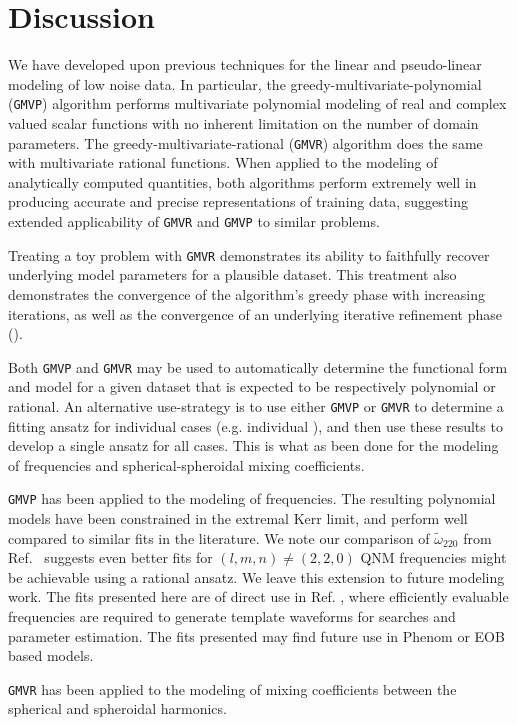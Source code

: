 \documentclass[twocolumn,aps,prd,floatfix,preprintnumbers,a4paper,nofootinbib,
superscriptaddress,10pt]{revtex4-1}
\newcommand{\cw}{\tilde{\omega}}
\def\gmvp#1{greedy-multivariate-polynomial#1
  (\texttt{GMVP}#1)\gdef\gmvp{\texttt{GMVP}}}
\def\gmvr#1{greedy-multivariate-rational#1
  (\texttt{GMVR}#1)\gdef\gmvr{\texttt{GMVR}}}
\begin{document}
\section{Discussion}
\label{discuss}
%
\par We have developed upon previous techniques for the linear and pseudo-linear modeling of low noise data.
%
In particular, the \gmvp{} algorithm performs multivariate polynomial modeling of real and complex valued scalar functions with no inherent limitation on the number of domain parameters.
%
The \gmvr{} algorithm does the same with multivariate rational functions.
%
When applied to the modeling of analytically computed quantities, both algorithms perform extremely well in producing accurate and precise representations of training data, suggesting extended applicability of \gmvr{} and \gmvp{} to similar problems.
%
\par Treating a toy problem with \gmvr{} demonstrates its ability to faithfully recover underlying model parameters for a plausible dataset.
%
This treatment also demonstrates the convergence of the algorithm's greedy phase with increasing iterations, as well as the convergence of an underlying iterative refinement phase ().
%
%
%
\par Both \gmvp{} and \gmvr{} may be used to automatically determine the functional form and model for a given dataset that is expected to be respectively polynomial or rational.
%
An alternative use-strategy is to use either \gmvp{} or \gmvr{} to determine a fitting ansatz for individual cases (e.g. individual ), and then use these results to develop a single ansatz for all cases.
%
This is what as been done for the modeling of \qnm{} frequencies and spherical-spheroidal mixing coefficients.
%
%
\par \gmvp{} has been applied to the modeling of \qnm{} frequencies. The resulting polynomial models have been constrained in the extremal Kerr limit, and perform well compared to similar fits in the literature. We note our comparison of $\cw_{220}$ from Ref.~\cite{Nagar:2018zoe} suggests even better fits for $(l,m,n)\neq(2,2,0)$ QNM frequencies might be achievable using a rational ansatz. We leave this extension to future modeling work.
%
The fits presented here are of direct use in Ref. \cite{London:2017bcn}, where efficiently evaluable \qnm{} frequencies are required to generate template waveforms for \gw{} searches and parameter estimation.
%
The fits presented may find future use in Phenom or EOB based \gw{} models.
%
\par \gmvr{} has been applied to the modeling of mixing coefficients between the spherical and spheroidal harmonics.
\end{document}
